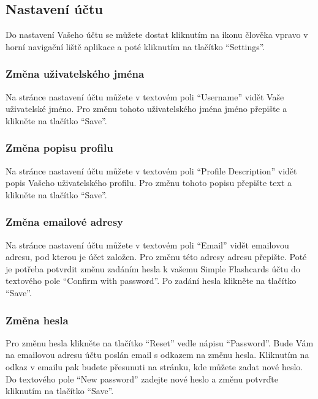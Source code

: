 \documentclass[a4paper,12pt]{article}
\begin{document}
\subsection{Nastavení účtu}
Do nastavení Vašeho účtu se můžete dostat kliknutím na ikonu člověka vpravo v horní navigační liště aplikace a poté kliknutím na tlačítko \enquote{Settings}.

\subsubsection*{Změna uživatelského jména}
Na stránce nastavení účtu můžete v textovém poli \enquote{Username} vidět Vaše uživatelské jméno. Pro změnu tohoto uživatelského jména jméno přepište a klikněte na tlačítko \enquote{Save}.

\subsubsection*{Změna popisu profilu}
Na stránce nastavení účtu můžete v textovém poli \enquote{Profile Description} vidět popis Vašeho uživatelského profilu. Pro změnu tohoto popisu přepište text a klikněte na tlačítko \enquote{Save}.

\subsubsection*{Změna emailové adresy}
Na stránce nastavení účtu můžete v textovém poli \enquote{Email} vidět emailovou adresu, pod kterou je účet založen. Pro změnu této adresy adresu přepište. Poté je potřeba potvrdit změnu zadáním hesla k vašemu Simple Flashcards účtu do textového pole \enquote{Confirm with password}. Po zadání hesla klikněte na tlačítko \enquote{Save}.

\subsubsection*{Změna hesla}
Pro změnu hesla klikněte na tlačítko \enquote{Reset} vedle nápisu \enquote{Password}. Bude Vám na emailovou adresu účtu poslán email s odkazem na změnu hesla. Kliknutím na odkaz v emailu pak budete přesunuti na stránku, kde můžete zadat nové heslo. Do textového pole \enquote{New password} zadejte nové heslo a změnu potvrďte kliknutím na tlačítko \enquote{Save}.
\end{document}
